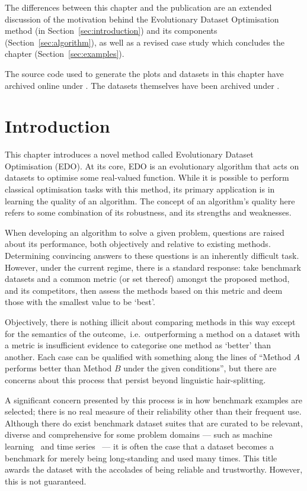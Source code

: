 \myrule%

The differences between this chapter and the publication are an extended
discussion of the motivation behind the Evolutionary Dataset Optimisation method
(in Section~\ref{sec:introduction}) and its components
(Section~\ref{sec:algorithm}), as well as a revised case study which concludes
the chapter (Section~\ref{sec:examples}).

The source code used to generate the plots and datasets in this chapter have
archived online under . The datasets themselves have
been archived under .

\section{Introduction}\label{sec:edo:intro}

This chapter introduces a novel method called Evolutionary Dataset Optimisation
(EDO). At its core, EDO is an evolutionary algorithm that acts on datasets to
optimise some real-valued function. While it is possible to perform classical
optimisation tasks with this method, its primary application is in learning the
quality of an algorithm. The concept of an algorithm's quality here refers to
some combination of its robustness, and its strengths and weaknesses.

When developing an algorithm to solve a given problem, questions are raised
about its performance, both objectively and relative to existing methods.
Determining convincing answers to these questions is an inherently difficult
task. However, under the current regime, there is a standard response: take 
benchmark datasets and a common metric (or set thereof) amongst the proposed
method, and its competitors, then assess the methods based on this metric and
deem those with the smallest value to be `best'.

Objectively, there is nothing illicit about comparing methods in this way except
for the semantics of the outcome,~i.e.\ outperforming a method on a dataset with
a metric is insufficient evidence to categorise one method as `better' than
another. Each case can be qualified with something along the lines of ``Method
\(A\) performs better than Method \(B\) under the given conditions'', but there
are concerns about this process that persist beyond linguistic hair-splitting. 

A significant concern presented by this process is in how benchmark examples are
selected; there is no real measure of their reliability other than their
frequent use. Although there do exist benchmark dataset suites that are curated
to be relevant, diverse and comprehensive for some problem domains --- such as
machine learning~\cite{Dua2019,Olson2017} and time series~\cite{UCRArchive2018}
--- it is often the case that a dataset becomes a benchmark for merely being
long-standing and used many times. This title awards the dataset with the
accolades of being reliable and trustworthy. However, this is not guaranteed.

